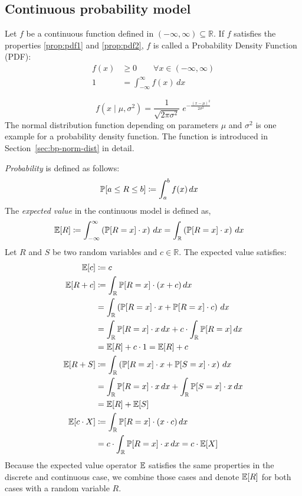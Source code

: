 \subsection{Continuous probability model}
\label{sec:bp-continuous}
%
Let $f$ be a continuous function defined in $(-\infty, \infty) \subseteq \mathbb R$.
If $f$ satisfies the properties \ref{prop:pdf1} and \ref{prop:pdf2}, $f$ is called a Probability Density Function (PDF):
\begin{align}
  f(x) &\geq 0 \qquad \forall x \in (-\infty, \infty) \label{prop:pdf1} \\
     1 &= \int_{-\infty}^{\infty} f(x) \, dx \label{prop:pdf2}
\end{align}
\begin{example}
  \[ f(x \; | \; \mu, \sigma^2) = \frac{1}{\sqrt{2\pi\sigma^2} } \; e^{ -\frac{(x-\mu)^2}{2\sigma^2} } \]
  The normal distribution function depending on parameters $\mu$ and $\sigma^2$ is one example for a probability density function.
  The function is introduced in Section~\ref{sec:bp-norm-dist} in detail.
\end{example}
%
\emph{Probability} is defined as follows:
\begin{align}
  \mathbb P[a \leq R \leq b] &\coloneqq \int_a^b f(x) \, dx
\end{align}
%
The \emph{expected value} in the continuous model is defined as,
%
\begin{align}
  \mathbb E[R] &\coloneqq \int_{-\infty}^\infty \left(\mathbb P[R=x] \cdot x\right) \, dx = \int_{\mathbb R} \left(\mathbb P[R=x] \cdot x\right) \, dx
\end{align}
%
Let $R$ and $S$ be two random variables and $c \in \mathbb R$.
The expected value satisfies:
%
\begin{align}
  \mathbb E[c]     &\coloneqq c \\
  \mathbb E[R + c] &\coloneqq \int_{\mathbb R} \mathbb P[R=x] \cdot (x + c) \, dx \nonumber\\
            &= \int_{\mathbb R} \left(\mathbb P[R=x] \cdot x + \mathbb P[R=x] \cdot c\right) \, dx \nonumber\\
            &= \int_{\mathbb R} \mathbb P[R=x] \cdot x \, dx + c \cdot \int_{\mathbb R} \mathbb P[R=x] \, dx \nonumber\\
            &= \mathbb E[R] + c \cdot 1 = \mathbb E[R] + c \\
  \mathbb E[R + S] &\coloneqq \int_{\mathbb R} \left(\mathbb P[R=x] \cdot x + \mathbb P[S=x] \cdot x\right) \, dx \nonumber\\
            &= \int_{\mathbb R} \mathbb P[R=x] \cdot x \, dx + \int_{\mathbb R} \mathbb P[S=x] \cdot x \, dx \nonumber\\
            &= \mathbb E[R] + \mathbb E[S] \label{eq:Evv} \\
  \mathbb E[c \cdot X] &\coloneqq \int_{\mathbb R} \mathbb P[R=x] \cdot (x \cdot c) \, dx \nonumber\\
            &= c \cdot \int_{\mathbb R} \mathbb P[R=x] \cdot x \, dx
            = c \cdot \mathbb E[X] \label{eq:Ecv}
\end{align}
%
Because the expected value operator $\mathbb E$ satisfies the same properties in the discrete and continuous case,
we combine those cases and denote $\mathbb E[R]$ for both cases with a random variable $R$.

